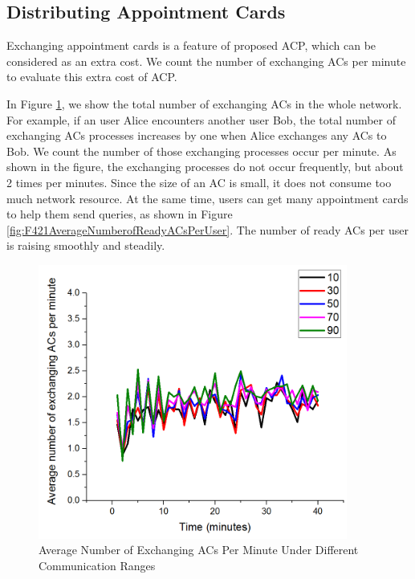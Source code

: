 \subsection{ Distributing Appointment Cards}

\noindent Exchanging appointment cards is a feature of proposed ACP, which can be considered as an extra cost. We count the number of exchanging ACs per minute to evaluate this extra cost of ACP.

In Figure \ref{fig:F422AverageNumberofExchangingACsPerMinute}, we show the total number of exchanging ACs in the whole network. For example, if an user Alice encounters another user Bob, the total number of exchanging ACs processes increases by one when Alice exchanges any ACs to Bob. We count the number of those exchanging processes occur per minute. As shown in the figure, the exchanging processes do not occur frequently, but about 2 times per minutes. Since the size of an AC is small, it does not consume too much network resource. At the same time, users can get many appointment cards to help them send queries, as shown in Figure \ref{fig:F421AverageNumberofReadyACsPerUser}. The number of ready ACs per user is raising smoothly and steadily. 

\begin{figure} [hbtp]
\centering 
\includegraphics[width=4.0in]{figures/F422AverageNumberofExchangingACsPerMinute.png}
\caption{Average Number of Exchanging ACs Per Minute Under Different Communication Ranges} 
\label{fig:F422AverageNumberofExchangingACsPerMinute} %
\end{figure}


